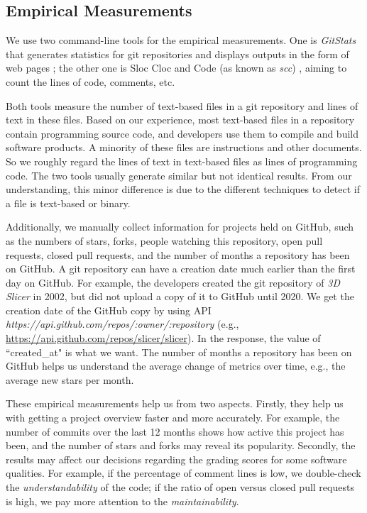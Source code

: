 \subsection{Empirical Measurements}
\label{sec_empirical_measurements}

We use two command-line tools for the empirical measurements. One is \textit{GitStats} that generates statistics for git repositories and displays outputs in the form of web pages \cite{Gieniusz2019}; the other one is Sloc Cloc and Code (as known as \textit{scc}) \cite{Boyter2021}, aiming to count the lines of code, comments, etc.

Both tools measure the number of text-based files in a git repository and lines of text in these files. Based on our experience, most text-based files in a repository contain programming source code, and developers use them to compile and build software products. A minority of these files are instructions and other documents. So we roughly regard the lines of text in text-based files as lines of programming code. The two tools usually generate similar but not identical results. From our understanding, this minor difference is due to the different techniques to detect if a file is text-based or binary.

Additionally, we manually collect information for projects held on GitHub, such as the numbers of stars, forks, people watching this repository, open pull requests, closed pull requests, and the number of months a repository has been on GitHub. A git repository can have a creation date much earlier than the first day on GitHub. For example, the developers created the git repository of \textit{3D Slicer} in 2002, but did not upload a copy of it to GitHub until 2020. We get the creation date of the GitHub copy by using API \textit{https://api.github.com/repos/{:owner}/{:repository}} (e.g., \hyperlink{https://api.github.com/repos/slicer/slicer}{https://api.github.com/repos/slicer/slicer}). In the response, the value of ``created\_at" is what we want. The number of months a repository has been on GitHub helps us understand the average change of metrics over time, e.g., the average new stars per month. 

These empirical measurements help us from two aspects. Firstly, they help us with getting a project overview faster and more accurately. For example, the number of commits over the last 12 months shows how active this project has been, and the number of stars and forks may reveal its popularity. Secondly, the results may affect our decisions regarding the grading scores for some software qualities. For example, if the percentage of comment lines is low, we double-check the \textit{understandability} of the code; if the ratio of open versus closed pull requests is high, we pay more attention to the \textit{maintainability}.

